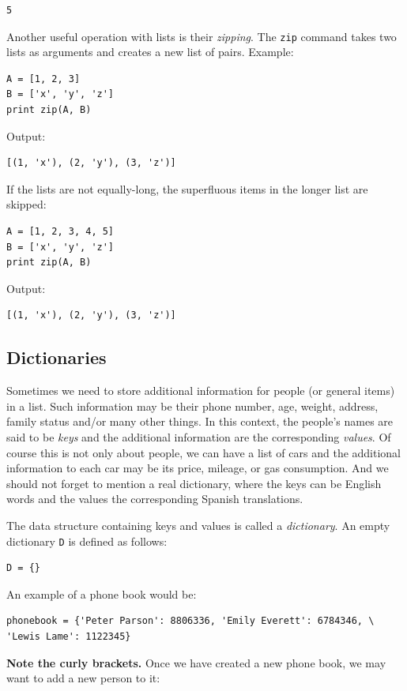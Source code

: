 \begin{verbatim}
5
\end{verbatim}
Another useful operation with lists is their {\em zipping}. The {\tt zip} command takes two lists as arguments 
and creates a new list of pairs. Example:

\begin{verbatim}
A = [1, 2, 3]
B = ['x', 'y', 'z']
print zip(A, B)
\end{verbatim}
Output:

\begin{verbatim}
[(1, 'x'), (2, 'y'), (3, 'z')]
\end{verbatim}
If the lists are not equally-long, the superfluous items in the longer list 
are skipped:

\begin{verbatim}
A = [1, 2, 3, 4, 5]
B = ['x', 'y', 'z']
print zip(A, B)
\end{verbatim}
Output:

\begin{verbatim}
[(1, 'x'), (2, 'y'), (3, 'z')]
\end{verbatim}

\subsection{Dictionaries}

Sometimes we need to store additional information for 
people (or general items) in a list. Such information may be  
their phone number, age, weight, address, family 
status and/or many other things. In this context, the 
people's names are said to be {\em keys} and the additional 
information are the corresponding {\em values}. Of course this 
is not only about people, we can have a list of cars and the 
additional information to each car may be its price, mileage, or
gas consumption. And we should not forget to mention a real 
dictionary, where the keys can be English words and the values the 
corresponding Spanish translations.

The data structure containing keys and values is called a {\em dictionary}. 
An empty dictionary {\tt D} is defined as follows:

\begin{verbatim}
D = {}
\end{verbatim}
An example of a phone book would be:

\begin{verbatim}
phonebook = {'Peter Parson': 8806336, 'Emily Everett': 6784346, \
'Lewis Lame': 1122345}
\end{verbatim}
{\bf Note the curly brackets.} 
Once we have created a new phone book, we may want to add a new person to it:

